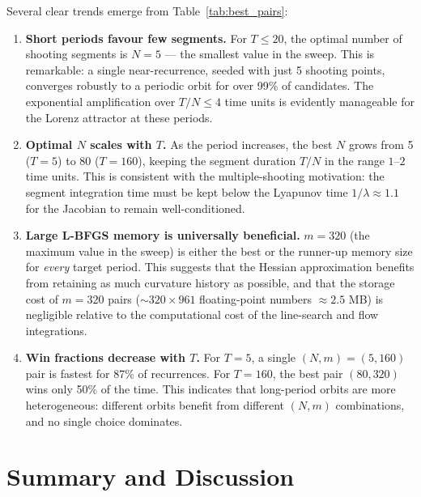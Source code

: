 \documentclass[11pt,a4paper]{article}
\begin{document}
Several clear trends emerge from Table~\ref{tab:best_pairs}:

\begin{enumerate}[label=(\roman*)]
  \item \textbf{Short periods favour few segments.}  For $T \le 20$, the
        optimal number of shooting segments is $N = 5$ --- the smallest value
        in the sweep.  This is remarkable: a single near-recurrence, seeded
        with just 5 shooting points, converges robustly to a periodic orbit
        for over 99\% of candidates.  The exponential amplification over
        $T/N \le 4$ time units is evidently manageable for the Lorenz
        attractor at these periods.

  \item \textbf{Optimal $N$ scales with $T$.}  As the period increases,
        the best $N$ grows from 5 ($T=5$) to 80 ($T=160$), keeping the
        segment duration $T/N$ in the range $1$--$2$ time units.  This is
        consistent with the multiple-shooting motivation: the segment
        integration time must be kept below the Lyapunov time
        $1/\lambda \approx 1.1$ for the Jacobian to remain well-conditioned.

  \item \textbf{Large L-BFGS memory is universally beneficial.}
        $m = 320$ (the maximum value in the sweep) is either the best or the
        runner-up memory size for \emph{every} target period.  This suggests
        that the Hessian approximation benefits from retaining as much
        curvature history as possible, and that the storage cost of $m=320$
        pairs ($\sim\!320 \times 961$ floating-point numbers $\approx 2.5$
        MB) is negligible relative to the computational cost of the
        line-search and flow integrations.

  \item \textbf{Win fractions decrease with $T$.}  For $T=5$, a single
        $(N,m)=(5,160)$ pair is fastest for 87\% of recurrences.  For
        $T=160$, the best pair $(80,320)$ wins only 50\% of the time.  This
        indicates that long-period orbits are more heterogeneous: different
        orbits benefit from different $(N,m)$ combinations, and no single
        choice dominates.
\end{enumerate}

\section{Summary and Discussion}
\end{document}
